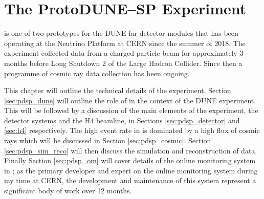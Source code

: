 \chapter{\label{ch:protodune}The ProtoDUNE--SP Experiment} 

\minitoc

%
% 

\protodune{} is one of two prototypes for the DUNE far detector modules that has
been operating at the Neutrino Platform at CERN since the summer of 2018. The
experiment collected data from a charged particle beam for approximately 3 
months before Long Shutdown 2 of the Large Hadron Collider. Since then a 
programme of cosmic ray data collection has been ongoing.

This chapter will outline the technical details of the \protodune{} experiment.
Section \ref{sec:pdsp_dune} will outline the role of \protodune{} in the context
of the DUNE experiment. This will be followed by a discussion of the main
elements of the experiment, the \protodune{} detector systems and the H4
beamline, in Sections \ref{sec:pdsp_detector} and \ref{sec:h4} respectively.
The high event rate in \protodune{} is dominated by a high flux of cosmic rays
which will be discussed in Section \ref{sec:pdsp_cosmic}. Section
\ref{sec:pdsp_sim_reco} will then discuss the simulation and reconstruction of 
\protodune{} data. Finally Section \ref{sec:pdsp_om} will cover details of the 
online monitoring system in \protodune{}; as the primary developer and expert 
on the \protodune{} online monitoring system during my time at CERN, the 
development and maintenance of this system represent a significant body of 
work over 12 months.  

